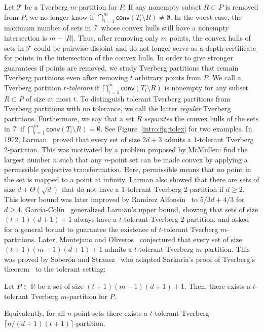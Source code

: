 \documentclass[oribibl,envcountsame,envcountsect]{llncs}
\newcommand{\mc}[1]{\ensuremath{\mathcal{#1}}}
\newcommand{\conv}{\mathsf{conv}}
\newcommand{\real}{\mathbb{R}}
\newcommand{\Soberon}{Sober\'{o}n}
\newcommand{\GarciaColin}{Garc\'{i}a-Col\'{i}n}
\begin{document}
Let $\mc{T}$ be a Tverberg $m$-partition for $P$. If any nonempty subset
$R\subset P$ is removed from $P$, we no longer know if $\bigcap_{i=1}^m
\conv(T_i \setminus R) \neq \emptyset$. In the worst-case, the maximum number of
sets in $\mc{T}$ whose convex hulls still have a nonempty intersection is
$m-|R|$. Thus, after removing only $m$ points, the convex hulls of sets in $\mc{T}$
could be pairwise disjoint and do not longer serve as a depth-certificate for
points in the intersection of the convex hulls. In order to give stronger
guarantees if
points are removed, we study Tverberg
partitions that remain Tverberg partitions even after removing $t$ arbitrary
points from $P$. We call a Tverberg partition \emph{$t$-tolerant}
if $\bigcap_{i=1}^m \conv(T_i \setminus R)$ is nonempty for any subset $R\subset
P$ of size at most $t$. To distinguish tolerant Tverberg partitions from
Tverberg partitions with no tolerance, we  call the latter \emph{regular}
Tverberg partitions. Furthermore, we say that a set $R$ \emph{separates} the convex hulls of the
sets in $\mc{T}$ if $\bigcap_{i=1}^m \conv(T_i \setminus R) = \emptyset$. See
Figure~\ref{intro:fig:tolex} for two examples.
In 1972, Larman~\cite{Larman1972} proved that
every set of size $2d+3$ admits a $1$-tolerant Tverberg
$2$-partition.  This was motivated by a problem proposed by
McMullen: find the largest number $n$ such that any $n$-point set
can be made convex by applying a permissible projective
transformation. Here, permissible means
that no point in the set is mapped to a point at infinity.
Larman also showed that there are sets of size $d+\Theta(\sqrt{d})$
that do not have a $1$-tolerant Tverberg
$2$-partition if $d\geq 2$. This lower bound was later improved by
Ram\'irez Alfons\'in~\cite{Alfonsin2001} to
$5/3 d + 4/3$ for $d\geq 4$. \GarciaColin{}~\cite{GarciaColin2007} generalized
Larman's upper bound, showing that sets of size $(t+1)(d+1)+1$ always have a
$t$-tolerant Tverberg $2$-partition, and asked for a general bound to guarantee the
existence of $t$-tolerant Tverberg $m$-partitions. Later, Montejano and
Oliveros~\cite{Montejano2011} conjectured that every set of size $(t+1)(m-1)(d+1)+1$ admits a
$t$-tolerant Tverberg $m$-partition. This
was proved by \Soberon{} and Strausz~\cite{Soberon2012} who adapted Sarkaria's
proof of Tverberg's theorem~\cite{Sarkaria1992} to the tolerant setting:

\begin{theorem}[\Soberon{}-Strausz-Theorem~\cite{Soberon2012}]\label{thm:sobstrau}
  Let $P\subset \real$ be a set of size $(t+1)(m-1)(d+1)+1$. Then, there exists
  a $t$-tolerant Tverberg $m$-partition for $P$.

  Equivalently, for all $n$-point sets there
  exists a $t$-tolerant Tverberg $\lceil n/(d+1)(t+1)\rceil$-partition.
\end{theorem}
\end{document}
